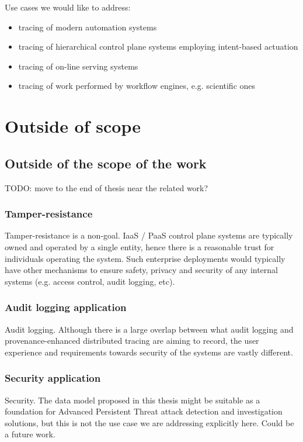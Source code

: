 \par 

Use cases we would like to address:

\begin{itemize}
    \item tracing of modern automation systems 
    \item tracing of hierarchical control plane systems employing intent-based actuation
    \item tracing of on-line serving systems
    \item tracing of work performed by workflow engines, e.g. scientific ones
\end{itemize}

\newpage %
\section{Outside of scope}
\subsection*{Outside of the scope of the work}
\setlength{\parskip}{9.96pt}

TODO: move to the end of thesis near the related work?
\par

\subsubsection*{Tamper-resistance}
Tamper-resistance is a non-goal. IaaS / PaaS control plane systems are typically owned and operated by a single entity, hence there is a reasonable trust for individuals operating the system. Such enterprise deployments would typically have other mechanisms to ensure safety, privacy and security of any internal systems (e.g. access control, audit logging, etc).
\par

\subsubsection*{Audit logging application}
Audit logging. Although there is a large overlap between what audit logging and provenance-enhanced distributed tracing are aiming to record, the user experience and requirements towards security of the systems are vastly different.
\par

\subsubsection*{Security application}
Security. The data model proposed in this thesis might be suitable as a foundation for Advanced Persistent Threat attack detection and investigation solutions, but this is not the use case we are addressing explicitly here. Could be a future work.
\par

